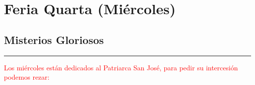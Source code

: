 \documentclass[10pt,twoside]{book}
\begin{document}

\section*{\centering Feria Quarta (Miércoles)}

\noindent\subsection*{Misterios Gloriosos}



\vspace{0.5em}



\vspace{1.5em}





\vspace{1.5em}





\vspace{1.5em}





\vspace{1.5em}



{}

\iralfinal

\begin{center}
      {\rule{10em}{0.4pt}}

      \vspace{0.75em}

      \textcolor{red}{Los miércoles están dedicados al Patriarca San José, para pedir su intercesión podemos rezar:}
\end{center}

\begin{multicols}{2}
      
\end{multicols}
\end{document}
